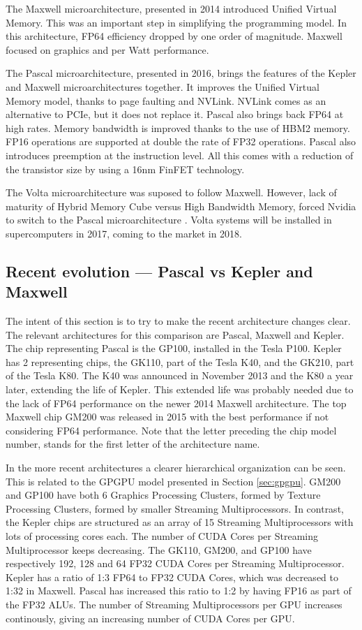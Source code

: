The Maxwell microarchitecture, presented in 2014 introduced Unified Virtual Memory.
This was an important step in simplifying the programming model.
In this architecture, FP64 efficiency dropped by one order of magnitude.
Maxwell focused on graphics and per Watt performance.

The Pascal microarchitecture, presented in 2016, brings the features of the Kepler and Maxwell microarchitectures together.
It improves the Unified Virtual Memory model, thanks to page faulting and NVLink.
NVLink comes as an alternative to PCIe, but it does not replace it.
Pascal also brings back FP64 at high rates.
Memory bandwidth is improved thanks to the use of HBM2 memory.
FP16 operations are supported at double the rate of FP32 operations.
Pascal also introduces preemption at the instruction level.
All this comes with a reduction of the transistor size by using a 16nm FinFET technology.

The Volta microarchitecture was suposed to follow Maxwell.
However, lack of maturity of Hybrid Memory Cube versus High Bandwidth Memory, forced Nvidia to switch to the Pascal microarchitecture \cite{wccftech:volta}.
Volta systems will be installed in supercomputers in 2017, coming to the market in 2018.

\subsection{Recent evolution --- Pascal vs Kepler and Maxwell}
The intent of this section is to try to make the recent architecture changes clear.
The relevant architectures for this comparison are Pascal, Maxwell and Kepler.
The chip representing Pascal is the GP100, installed in the Tesla P100.
Kepler has 2 representing chips, the GK110, part of the Tesla K40, and the GK210, part of the Tesla K80.
The K40 was announced in November 2013 and the K80 a year later, extending the life of Kepler.
This extended life was probably needed due to the lack of FP64 performance on the newer 2014 Maxwell architecture.
The top Maxwell chip GM200 was released in 2015 with the best performance if not considering FP64 performance.
Note that the letter preceding the chip model number, stands for the first letter of the architecture name.

In the more recent architectures a clearer hierarchical organization can be seen.
This is related to the GPGPU model presented in Section \ref{sec:gpgpu}.
GM200 and GP100 have both 6 Graphics Processing Clusters, formed by Texture Processing Clusters, formed by smaller Streaming Multiprocessors.
In contrast, the Kepler chips are structured as an array of 15 Streaming Multiprocessors with lots of processing cores each.
The number of CUDA Cores per Streaming Multiprocessor keeps decreasing.
The GK110, GM200, and GP100 have respectively 192, 128 and 64 FP32 CUDA Cores per Streaming Multiprocessor.
Kepler has a ratio of 1:3 FP64 to FP32 CUDA Cores, which was decreased to 1:32 in Maxwell.
Pascal has increased this ratio to 1:2 by having FP16 as part of the FP32 ALUs.
The number of Streaming Multiprocessors per GPU increases continously, giving an increasing number of CUDA Cores per GPU.

